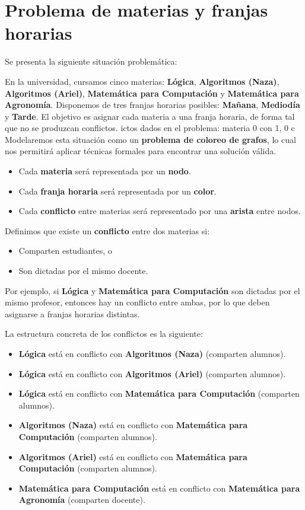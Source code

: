 \documentclass[a4paper,11pt]{article}
\begin{document}
\newpage
\section{Problema de materias y franjas horarias}

Se presenta la siguiente situación problemática:

En la universidad, cursamos cinco materias: \textbf{Lógica}, \textbf{Algoritmos (Naza)}, \textbf{Algoritmos (Ariel)}, \textbf{Matemática para Computación} y \textbf{Matemática para Agronomía}. Disponemos de tres franjas horarias posibles: \textbf{Mañana}, \textbf{Mediodía} y \textbf{Tarde}. El objetivo es asignar cada materia a una franja horaria, de forma tal que no se produzcan conflictos.
ictos dados en el problema: materia 0 con 1, 0 c
Modelaremos esta situación como un \textbf{problema de coloreo de grafos}, lo cual nos permitirá aplicar técnicas formales para encontrar una solución válida.

\begin{itemize}
    \item Cada \textbf{materia} será representada por un \textbf{nodo}.
    \item Cada \textbf{franja horaria} será representada por un \textbf{color}.
    \item Cada \textbf{conflicto} entre materias será representado por una \textbf{arista} entre nodos.
\end{itemize}

Definimos que existe un \textbf{conflicto} entre dos materias si:
\begin{itemize}
    \item Comparten estudiantes, o
    \item Son dictadas por el mismo docente.
\end{itemize}

Por ejemplo, si \textbf{Lógica} y \textbf{Matemática para Computación} son dictadas por el mismo profesor, entonces hay un conflicto entre ambas, por lo que deben asignarse a franjas horarias distintas.

La estructura concreta de los conflictos es la siguiente:
\begin{itemize}
    \item \textbf{Lógica} está en conflicto con \textbf{Algoritmos (Naza)} (comparten alumnos).
    \item \textbf{Lógica} está en conflicto con \textbf{Algoritmos (Ariel)} (comparten alumnos).
    \item \textbf{Lógica} está en conflicto con \textbf{Matemática para Computación} (comparten alumnos).
    \item \textbf{Algoritmos (Naza)} está en conflicto con \textbf{Matemática para Computación} (comparten alumnos).
    \item \textbf{Algoritmos (Ariel)} está en conflicto con \textbf{Matemática para Computación} (comparten alumnos).
    \item \textbf{Matemática para Computación} está en conflicto con \textbf{Matemática para Agronomía} (comparten docente).
\end{itemize}
\end{document}
